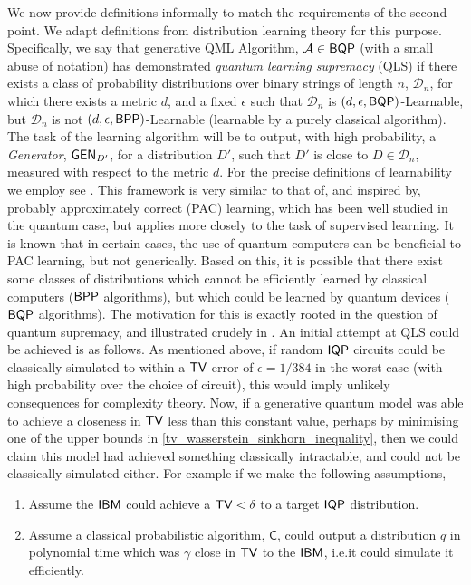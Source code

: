 We now provide definitions informally to match the requirements of the second point. We adapt definitions from distribution learning theory\cite{kearns_learnability_1994} for this purpose. Specifically, we say that generative QML Algorithm, $\mathcal{A}\in \textsf{BQP}$ (with a small abuse of notation) has demonstrated \textit{quantum learning supremacy} (QLS) if there exists a class of probability distributions over binary strings of length $n$, $\mathcal{D}_n$, for which there exists a metric $d$, and a fixed $\epsilon$ such that $\mathcal{D}_n$ is $\left( d ,\epsilon, \textsf{BQP} \right)$-Learnable, but $\mathcal{D}_n$ is not $\left( d ,\epsilon, \textsf{BPP} \right)$-Learnable (learnable by a purely classical algorithm). The task of the learning algorithm will be to output, with high probability, a \textit{Generator}, $\operatorname{\textsf{GEN}}_{D'}$, for a distribution $D'$, such that $D'$ is close to $D \in \mathcal{D}_n$, measured with respect to the metric $d$. For the precise definitions of learnability we employ see .
This framework is very similar to that of, and inspired by, probably approximately correct (PAC) learning, which has been well studied in the quantum case\cite{arunachalam_survey_2017}, but applies more closely to the task of supervised learning. It is known that in certain cases, the use of quantum computers can be beneficial to PAC learning, but not generically\cite{arunachalam_quantum_2019}. Based on this, it is possible that there exist some classes of distributions which cannot be efficiently learned by classical computers ($\textsf{BPP}$ algorithms), but which could be learned by quantum devices ($\textsf{BQP}$ algorithms). The motivation for this is exactly rooted in the question of quantum supremacy, and illustrated crudely in . An initial attempt at QLS could be achieved is as follows. As mentioned above, if random $\operatorname{\textsf{IQP}}$ circuits could be classically simulated to within a $\operatorname{\textsf{TV}}$ error of $\epsilon = 1/384$\cite{bremner_average-case_2016} in the worst case (with high probability over the choice of circuit), this would imply unlikely consequences for complexity theory. Now, if a generative quantum model was able to achieve a closeness in $\operatorname{\textsf{TV}}$ less than this constant value, perhaps by minimising one of the upper bounds in \eqref{tv_wasserstein_sinkhorn_inequality}, then we could claim this model had achieved something classically intractable, and could not be classically simulated either. For example if we make the following assumptions,
\begin{enumerate}
    \item Assume the $\textsf{IBM}$ could achieve a $\operatorname{\textsf{TV}} < \delta$ to a target $\operatorname{\textsf{IQP}}$ distribution. 
    \item Assume a classical probabilistic algorithm, $\mathsf{C}$, could output a distribution $q$ in polynomial time which was $\gamma$ close in $\operatorname{\textsf{TV}}$ to the $\textsf{IBM}$, i.e.\@ it could simulate it efficiently.
\end{enumerate}
